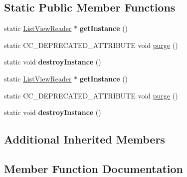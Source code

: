 \subsection*{Static Public Member Functions}
\begin{DoxyCompactItemize}
\item 
\mbox{\label{classcocostudio_1_1ListViewReader_a4f585cc983a16b2ec9f28e5e1e5fb39c}} 
static \hyperlink{classcocostudio_1_1ListViewReader}{List\+View\+Reader} $\ast$ {\bfseries get\+Instance} ()
\item 
static C\+C\+\_\+\+D\+E\+P\+R\+E\+C\+A\+T\+E\+D\+\_\+\+A\+T\+T\+R\+I\+B\+U\+TE void \hyperlink{classcocostudio_1_1ListViewReader_a20c59e870feb7706d0dd0ebc58f56100}{purge} ()
\item 
\mbox{\label{classcocostudio_1_1ListViewReader_aa6db680640c833be0402d4b6ddef8455}} 
static void {\bfseries destroy\+Instance} ()
\item 
\mbox{\label{classcocostudio_1_1ListViewReader_a9e1e15fe97489b35ad42d20ab63cd5e6}} 
static \hyperlink{classcocostudio_1_1ListViewReader}{List\+View\+Reader} $\ast$ {\bfseries get\+Instance} ()
\item 
static C\+C\+\_\+\+D\+E\+P\+R\+E\+C\+A\+T\+E\+D\+\_\+\+A\+T\+T\+R\+I\+B\+U\+TE void \hyperlink{classcocostudio_1_1ListViewReader_a20c59e870feb7706d0dd0ebc58f56100}{purge} ()
\item 
\mbox{\label{classcocostudio_1_1ListViewReader_a05f7d5174939ff186f84611183ab8d00}} 
static void {\bfseries destroy\+Instance} ()
\end{DoxyCompactItemize}
\subsection*{Additional Inherited Members}


\subsection{Member Function Documentation}
\mbox{\label{classcocostudio_1_1ListViewReader_a20c59e870feb7706d0dd0ebc58f56100}} 
